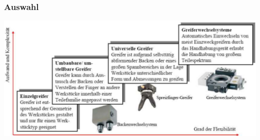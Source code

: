 \begin{minipage}{0.7\linewidth}
    \subsubsection{Auswahl}
     \includegraphics[width=\linewidth]{./bilder/GreiferAuswahl}
\end{minipage}
\clearpage

